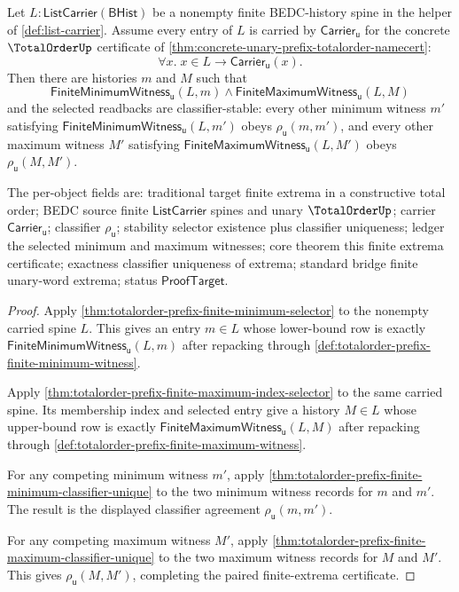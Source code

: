 \begin{theorem}
\label{thm:totalorder-prefix-finite-extrema-certificate}
Let $L:\mathsf{ListCarrier}(\mathsf{BHist})$ be a nonempty finite BEDC-history
spine in the helper of \autoref{def:list-carrier}. Assume every entry of $L$ is
carried by $\mathsf{Carrier}_{\mathsf{u}}$ for the concrete $\TotalOrderUp$
certificate of \autoref{thm:concrete-unary-prefix-totalorder-namecert}:
$$
\forall x.\; x\in L\to \mathsf{Carrier}_{\mathsf{u}}(x).
$$
Then there are histories $m$ and $M$ such that
$$
\mathsf{FiniteMinimumWitness}_{\mathsf{u}}(L,m)
\land
\mathsf{FiniteMaximumWitness}_{\mathsf{u}}(L,M)
$$
and the selected readbacks are classifier-stable: every other minimum witness
$m'$ satisfying $\mathsf{FiniteMinimumWitness}_{\mathsf{u}}(L,m')$ obeys
$\rho_{\mathsf{u}}(m,m')$, and every other maximum witness $M'$ satisfying
$\mathsf{FiniteMaximumWitness}_{\mathsf{u}}(L,M')$ obeys
$\rho_{\mathsf{u}}(M,M')$.

The per-object fields are: traditional target finite extrema in a constructive
total order; BEDC source finite $\mathsf{ListCarrier}$ spines and unary
$\TotalOrderUp$; carrier $\mathsf{Carrier}_{\mathsf{u}}$; classifier
$\rho_{\mathsf{u}}$; stability selector existence plus classifier uniqueness;
ledger the selected minimum and maximum witnesses; core theorem this finite
extrema certificate; exactness classifier uniqueness of extrema; standard
bridge finite unary-word extrema; status $\mathsf{ProofTarget}$.
\end{theorem}
\begin{proof}
Apply \autoref{thm:totalorder-prefix-finite-minimum-selector} to the nonempty
carried spine $L$. This gives an entry $m\in L$ whose lower-bound row is exactly
$\mathsf{FiniteMinimumWitness}_{\mathsf{u}}(L,m)$ after repacking through
\autoref{def:totalorder-prefix-finite-minimum-witness}.

Apply \autoref{thm:totalorder-prefix-finite-maximum-index-selector} to the same
carried spine. Its membership index and selected entry give a history $M\in L$
whose upper-bound row is exactly
$\mathsf{FiniteMaximumWitness}_{\mathsf{u}}(L,M)$ after repacking through
\autoref{def:totalorder-prefix-finite-maximum-witness}.

For any competing minimum witness $m'$, apply
\autoref{thm:totalorder-prefix-finite-minimum-classifier-unique} to the two
minimum witness records for $m$ and $m'$. The result is the displayed classifier
agreement $\rho_{\mathsf{u}}(m,m')$.

For any competing maximum witness $M'$, apply
\autoref{thm:totalorder-prefix-finite-maximum-classifier-unique} to the two
maximum witness records for $M$ and $M'$. This gives
$\rho_{\mathsf{u}}(M,M')$, completing the paired finite-extrema certificate.
\end{proof}

